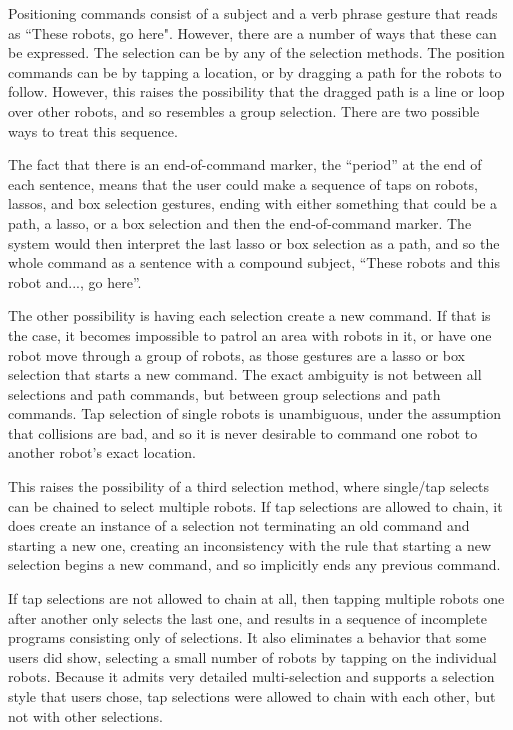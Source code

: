 Positioning commands consist of a subject and a verb phrase gesture that reads as ``These robots, go here". 
However, there are a number of ways that these can be expressed. 
The selection can be by any of the selection methods. 
The position commands can be by tapping a location, or by dragging a path for the robots to follow. 
However, this raises the possibility that the dragged path is a line or loop over other robots, and so resembles a group selection. 
There are two possible ways to treat this sequence. 

The fact that there is an end-of-command marker, the ``period'' at the end of each sentence, means that the user could make a sequence of taps on robots, lassos, and box selection gestures, ending with either something that could be a path, a lasso, or a box selection and then the end-of-command marker. 
The system would then interpret the last lasso or box selection as a path, and so the whole command as a sentence with a compound subject, ``These robots and this robot and..., go here''. 

The other possibility is having each selection create a new command. 
If that is the case, it becomes impossible to patrol an area with robots in it, or have one robot move through a group of robots, as those gestures are a lasso or box selection that starts a new command. 
The exact ambiguity is not between all selections and path commands, but between group selections and path commands.
Tap selection of single robots is unambiguous, under the assumption that collisions are bad, and so it is never desirable to command one robot to another robot's exact location. 

This raises the possibility of a third selection method, where single/tap selects can be chained to select multiple robots. 
If tap selections are allowed to chain, it does create an instance of a selection not terminating an old command and starting a new one, creating an inconsistency with the rule that starting a new selection begins a new command, and so implicitly ends any previous command.

If tap selections are not allowed to chain at all, then tapping multiple robots one after another only selects the last one, and results in a sequence of incomplete programs consisting only of selections. 
It also eliminates a behavior that some users did show, selecting a small number of robots by tapping on the individual robots. 
Because it admits very detailed multi-selection and supports a selection style that users chose, tap selections were allowed to chain with each other, but not with other selections. 

